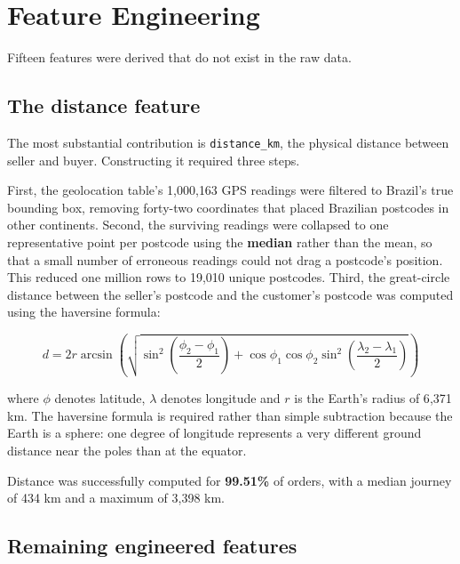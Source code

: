 \documentclass[11pt,a4paper]{report}
\begin{document}
\section{Feature Engineering}

Fifteen features were derived that do not exist in the raw data.

\subsection{The distance feature}

The most substantial contribution is \texttt{distance\_km}, the physical distance
between seller and buyer. Constructing it required three steps.

First, the geolocation table's 1{,}000{,}163 GPS readings were filtered to
Brazil's true bounding box, removing forty-two coordinates that placed Brazilian
postcodes in other continents. Second, the surviving readings were collapsed to
one representative point per postcode using the \textbf{median} rather than the
mean, so that a small number of erroneous readings could not drag a postcode's
position. This reduced one million rows to 19{,}010 unique postcodes. Third, the
great-circle distance between the seller's postcode and the customer's postcode
was computed using the haversine formula:

\begin{equation}
d = 2r \arcsin\left(\sqrt{\sin^{2}\left(\frac{\phi_2-\phi_1}{2}\right) +
\cos\phi_1 \cos\phi_2 \sin^{2}\left(\frac{\lambda_2-\lambda_1}{2}\right)}\right)
\end{equation}

where $\phi$ denotes latitude, $\lambda$ denotes longitude and $r$ is the Earth's
radius of 6{,}371 km. The haversine formula is required rather than simple
subtraction because the Earth is a sphere: one degree of longitude represents a
very different ground distance near the poles than at the equator.

Distance was successfully computed for \textbf{99.51\%} of orders, with a median
journey of 434 km and a maximum of 3{,}398 km.

\subsection{Remaining engineered features}
\end{document}
